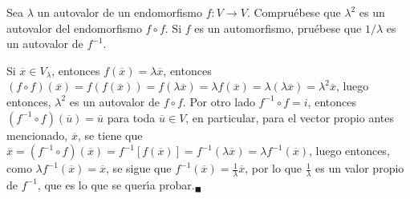 \begin{enunciado}
 Sea $\lambda$ un autovalor de un endomorfismo $f:V \rightarrow V$. Compru\'ebese que $\lambda^2$ es un autovalor del endomorfismo $f\circ f$. Si $f$ es un automorfismo, pru\'ebese que $1/\lambda$ es un autovalor de $f^{-1}$.
\end{enunciado}

\begin{solucion}
 Si $\overline{x} \in V_{\lambda}$, entonces $f(\overline{x}) = \lambda\overline{x}$, entonces $(f\circ f)(\overline{x}) = f\left( f(\overline{x}) \right) = f\left( \lambda \overline{x} \right) = \lambda f(\overline{x}) = \lambda(\lambda \overline{x}) = \lambda^2 \overline{x}$, luego entonces, $\lambda^2$ es un autovalor de $f\circ f$. Por otro lado $f^{-1}\circ f = i$, entonces $\left(f^{-1} \circ f\right) (\overline{u}) = \overline{u}$ para toda $\overline{u} \in V$, en particular, para el vector propio antes mencionado, $\overline{x}$, se tiene que $\overline{x} = \left( f^{-1}\circ f \right)(\overline{x}) = f^{-1}\left[f(\overline{x})\right] = f^{-1}(\lambda \overline{x}) = \lambda f^{-1}(\overline{x})$, luego entonces, como $\lambda f^{-1}(\overline{x}) = \overline{x}$, se sigue que $f^{-1}(\overline{x}) = \frac{1}{\lambda}\overline{x}$, por lo que $\frac{1}{\lambda}$ es un valor propio de $f^{-1}$, que es lo que se quer\'{\i}a probar.${}_{\blacksquare}$
\end{solucion}

